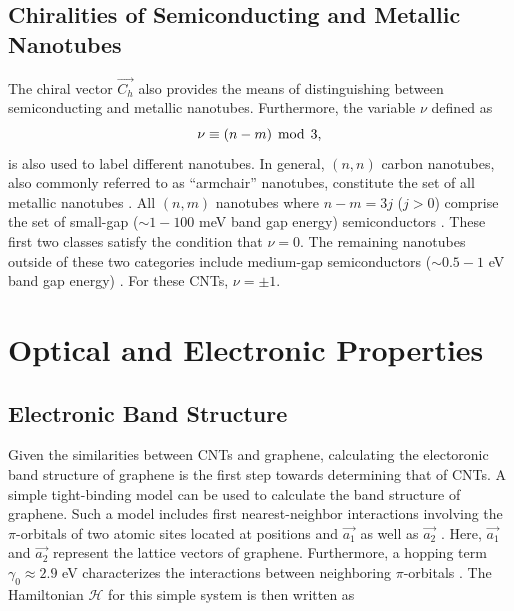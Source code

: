 \subsection{Chiralities of Semiconducting and Metallic Nanotubes}
The chiral vector $\vec{C_h}$ also provides the means of distinguishing between semiconducting and metallic nanotubes. Furthermore, the variable $\nu$ defined as 
\begin{equation}
	\nu \equiv (n-m) \mathrm{\hspace{1.5mm} mod \hspace{1.5mm}} 3,
	\label{eq:nu_cnt}
\end{equation}
is also used to label different nanotubes. In general, $(n,n)$ carbon nanotubes, also commonly referred to as ``armchair'' nanotubes, constitute the set of all metallic nanotubes \cite{nanot2012optoelectronic}. All $(n,m)$ nanotubes where $n-m = 3j$ ($j > 0$) comprise the set of small-gap ($\sim1 - 100$ meV band gap energy) semiconductors \cite{nanot2012optoelectronic}. These first two classes satisfy the condition that $\nu = 0 $. The remaining nanotubes outside of these two categories include medium-gap semiconductors ($\sim0.5 - 1$ eV band gap energy) \cite{nanot2012optoelectronic}. For these CNTs, $\nu = \pm 1$.


\section{Optical and Electronic Properties}

\subsection{Electronic Band Structure}

Given the similarities between CNTs and graphene, calculating the electoronic band structure of graphene is the first step towards determining that of CNTs. A simple tight-binding model can be used to calculate the band structure of graphene. Such a model includes first nearest-neighbor interactions involving the $\pi$-orbitals of two atomic sites located at positions and $\vec{a_1}$ as well as $\vec{a_2}$ \cite{charlier2007electronic}. Here, $\vec{a_1}$ and $\vec{a_2}$ represent the lattice vectors of graphene. Furthermore, a hopping term $\gamma_0 \approx 2.9$ eV  characterizes the interactions between neighboring $\pi$-orbitals \cite{charlier2007electronic}. The Hamiltonian $\mathcal{H}$ for this simple system is then written as 

